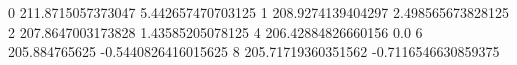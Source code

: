 0 211.8715057373047 5.442657470703125
1 208.9274139404297 2.498565673828125
2 207.8647003173828 1.43585205078125
4 206.42884826660156 0.0
6 205.884765625 -0.5440826416015625
8 205.71719360351562 -0.7116546630859375
